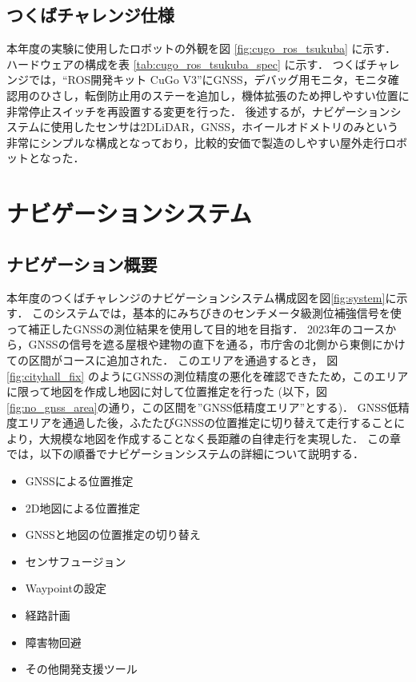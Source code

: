 \documentclass[platex,dvipdfmx]{rbproceedings}
\begin{document}
\subsection{つくばチャレンジ仕様}
本年度の実験に使用したロボットの外観を図 \ref{fig:cugo_ros_tsukuba} に示す．
ハードウェアの構成を表 \ref{tab:cugo_ros_tsukuba_spec} に示す．
つくばチャレンジでは，“ROS開発キット CuGo V3”にGNSS，デバッグ用モニタ，モニタ確認用のひさし，転倒防止用のステーを追加し，機体拡張のため押しやすい位置に非常停止スイッチを再設置する変更を行った．
後述するが，ナビゲーションシステムに使用したセンサは2DLiDAR，GNSS，ホイールオドメトリのみという非常にシンプルな構成となっており，比較的安価で製造のしやすい屋外走行ロボットとなった．

\section{ナビゲーションシステム}
\subsection{ナビゲーション概要}

本年度のつくばチャレンジのナビゲーションシステム構成図を図\ref{fig:system}に示す．
このシステムでは，基本的にみちびきのセンチメータ級測位補強信号を使って補正したGNSSの測位結果を使用して目的地を目指す．
2023年のコースから，GNSSの信号を遮る屋根や建物の直下を通る，市庁舎の北側から東側にかけての区間がコースに追加された．
このエリアを通過するとき， 図\ref{fig:cityhall_fix} のようにGNSSの測位精度の悪化を確認できたため，このエリアに限って地図を作成し地図に対して位置推定を行った
(以下，図\ref{fig:no_gnss_area}の通り，この区間を”GNSS低精度エリア”とする)．
GNSS低精度エリアを通過した後，ふたたびGNSSの位置推定に切り替えて走行することにより，大規模な地図を作成することなく長距離の自律走行を実現した．
この章では，以下の順番でナビゲーションシステムの詳細について説明する．

\begin{itemize}
    \item GNSSによる位置推定
    \item 2D地図による位置推定
    \item GNSSと地図の位置推定の切り替え
    \item センサフュージョン
    \item Waypointの設定
    \item 経路計画
    \item 障害物回避
    \item その他開発支援ツール
\end{itemize}
\end{document}
